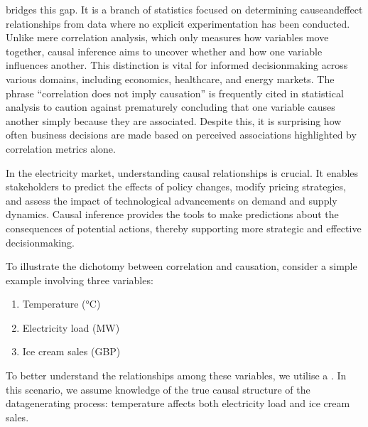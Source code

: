 \documentclass[letterpaper,10pt,english]{jupyterBook}
\begin{document}
\sphinxAtStartPar
{} bridges this gap. It is a branch of statistics focused on determining cause\sphinxhyphen{}and\sphinxhyphen{}effect relationships from data where no explicit experimentation has been conducted. Unlike mere correlation analysis, which only measures how variables move together, causal inference aims to uncover whether and how one variable influences another. This distinction is vital for informed decision\sphinxhyphen{}making across various domains, including economics, healthcare, and energy markets. The phrase “correlation does not imply causation” is frequently cited in statistical analysis to caution against prematurely concluding that one variable causes another simply because they are associated. Despite this, it is surprising how often business decisions are made based on perceived associations highlighted by correlation metrics alone.

\sphinxAtStartPar
In the electricity market, understanding causal relationships is crucial. It enables stakeholders to predict the effects of policy changes, modify pricing strategies, and assess the impact of technological advancements on demand and supply dynamics. Causal inference provides the tools to make predictions about the consequences of potential actions, thereby supporting more strategic and effective decision\sphinxhyphen{}making.

\sphinxAtStartPar
{}

\sphinxAtStartPar
To illustrate the dichotomy between correlation and causation, consider a simple example involving three variables:
\begin{enumerate}
%
\item {} 
\sphinxAtStartPar
Temperature (°C)

\item {} 
\sphinxAtStartPar
Electricity load (MW)

\item {} 
\sphinxAtStartPar
Ice cream sales (GBP)

\end{enumerate}

\sphinxAtStartPar
To better understand the relationships among these variables, we utilise a . In this scenario, we assume knowledge of the true causal structure of the data\sphinxhyphen{}generating process: temperature affects both electricity load and ice cream sales.
\end{document}
